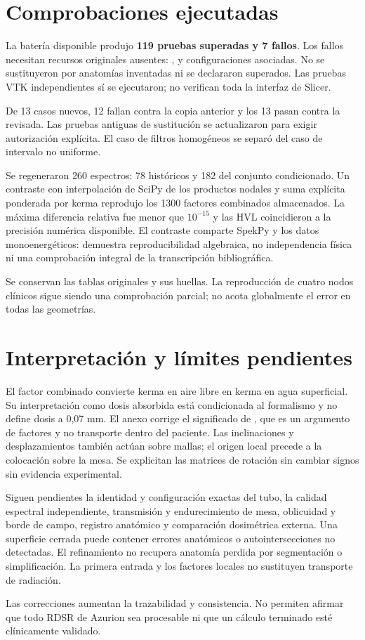 \section{Comprobaciones ejecutadas}
La batería disponible produjo \textbf{119 pruebas superadas y 7 fallos}. Los fallos necesitan recursos originales ausentes: ,  y configuraciones asociadas. No se sustituyeron por anatomías inventadas ni se declararon superados. Las pruebas VTK independientes sí se ejecutaron; no verifican toda la interfaz de Slicer.

De 13 casos nuevos, 12 fallan contra la copia anterior y los 13 pasan contra la revisada. Las pruebas antiguas de sustitución se actualizaron para exigir autorización explícita. El caso de filtros homogéneos se separó del caso de intervalo no uniforme.

Se regeneraron 260 espectros: 78 históricos y 182 del conjunto condicionado. Un contraste con interpolación de SciPy de los productos nodales y suma explícita ponderada por kerma reprodujo los 1300 factores combinados almacenados. La máxima diferencia relativa fue menor que $10^{-15}$ y las HVL coincidieron a la precisión numérica disponible. El contraste comparte SpekPy y los datos monoenergéticos: demuestra reproducibilidad algebraica, no independencia física ni una comprobación integral de la transcripción bibliográfica.

Se conservan las tablas originales y sus huellas. La reproducción de cuatro nodos clínicos sigue siendo una comprobación parcial; no acota globalmente el error en todas las geometrías.

\section{Interpretación y límites pendientes}
El factor combinado convierte kerma en aire libre en kerma en agua superficial. Su interpretación como dosis absorbida está condicionada al formalismo y no define dosis a 0,07 mm. El anexo corrige el significado de , que es un argumento de factores y no transporte dentro del paciente. Las inclinaciones y desplazamientos también actúan sobre mallas; el origen local precede a la colocación sobre la mesa. Se explicitan las matrices de rotación sin cambiar signos sin evidencia experimental.

Siguen pendientes la identidad y configuración exactas del tubo, la calidad espectral independiente, transmisión y endurecimiento de mesa, oblicuidad y borde de campo, registro anatómico y comparación dosimétrica externa. Una superficie cerrada puede contener errores anatómicos o autointersecciones no detectadas. El refinamiento no recupera anatomía perdida por segmentación o simplificación. La primera entrada y los factores locales no sustituyen transporte de radiación.

Las correcciones aumentan la trazabilidad y consistencia. No permiten afirmar que todo RDSR de Azurion sea procesable ni que un cálculo terminado esté clínicamente validado.
